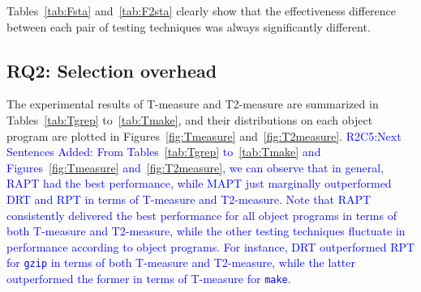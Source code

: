 \documentclass[10pt,journal,compsoc]{IEEEtran}
\begin{document}
Tables~\ref{tab:Fsta} and~\ref{tab:F2sta} clearly show that the effectiveness difference between each pair of testing techniques was always significantly different.

\subsection{RQ2: Selection overhead}

The experimental results of T-measure and T2-measure are summarized in Tables~\ref{tab:Tgrep} to~\ref{tab:Tmake}, and their distributions on each object program are plotted in Figures~\ref{fig:Tmeasure} and~\ref{fig:T2measure}. \textcolor{blue}{R2C5:Next Sentences Added: From Tables~\ref{tab:Tgrep} to~\ref{tab:Tmake} and Figures~\ref{fig:Tmeasure} and~\ref{fig:T2measure}, we can observe that in general, RAPT had the best performance, while MAPT just marginally outperformed DRT and RPT in terms of T-measure and T2-measure. Note that RAPT consistently delivered the best performance for all object programs in terms of both T-measure and T2-measure, while the other testing techniques fluctuate in performance according to object programs. For instance, DRT outperformed RPT for \texttt{gzip} in terms of both T-measure and T2-measure, while the latter outperformed the former in terms of T-measure for \texttt{make}.}
\end{document}
